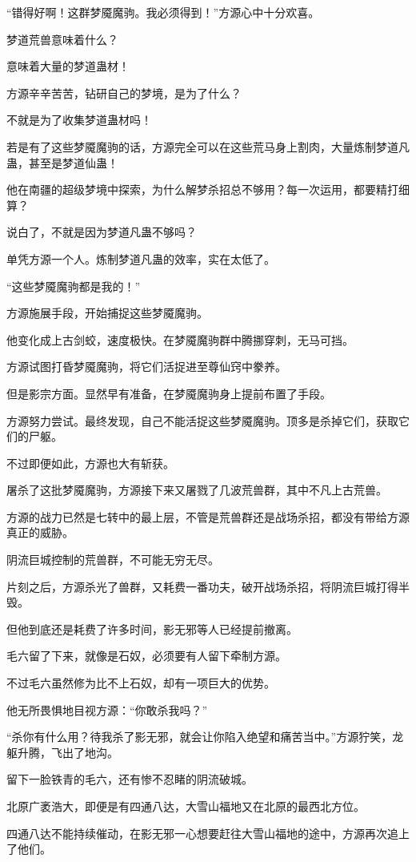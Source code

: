 \begin{this_body}
“错得好啊！这群梦魇魔驹。我必须得到！”方源心中十分欢喜。

梦道荒兽意味着什么？

意味着大量的梦道蛊材！

方源辛辛苦苦，钻研自己的梦境，是为了什么？

不就是为了收集梦道蛊材吗！

若是有了这些梦魇魔驹的话，方源完全可以在这些荒马身上割肉，大量炼制梦道凡蛊，甚至是梦道仙蛊！

他在南疆的超级梦境中探索，为什么解梦杀招总不够用？每一次运用，都要精打细算？

说白了，不就是因为梦道凡蛊不够吗？

单凭方源一个人。炼制梦道凡蛊的效率，实在太低了。

“这些梦魇魔驹都是我的！”

方源施展手段，开始捕捉这些梦魇魔驹。

他变化成上古剑蛟，速度极快。在梦魇魔驹群中腾挪穿刺，无马可挡。

方源试图打昏梦魇魔驹，将它们活捉进至尊仙窍中豢养。

但是影宗方面。显然早有准备，在梦魇魔驹身上提前布置了手段。

方源努力尝试。最终发现，自己不能活捉这些梦魇魔驹。顶多是杀掉它们，获取它们的尸躯。

不过即便如此，方源也大有斩获。

屠杀了这批梦魇魔驹，方源接下来又屠戮了几波荒兽群，其中不凡上古荒兽。

方源的战力已然是七转中的最上层，不管是荒兽群还是战场杀招，都没有带给方源真正的威胁。

阴流巨城控制的荒兽群，不可能无穷无尽。

片刻之后，方源杀光了兽群，又耗费一番功夫，破开战场杀招，将阴流巨城打得半毁。

但他到底还是耗费了许多时间，影无邪等人已经提前撤离。

毛六留了下来，就像是石奴，必须要有人留下牵制方源。

不过毛六虽然修为比不上石奴，却有一项巨大的优势。

他无所畏惧地目视方源：“你敢杀我吗？”

“杀你有什么用？待我杀了影无邪，就会让你陷入绝望和痛苦当中。”方源狞笑，龙躯升腾，飞出了地沟。

留下一脸铁青的毛六，还有惨不忍睹的阴流破城。

北原广袤浩大，即便是有四通八达，大雪山福地又在北原的最西北方位。

四通八达不能持续催动，在影无邪一心想要赶往大雪山福地的途中，方源再次追上了他们。


\end{this_body}
